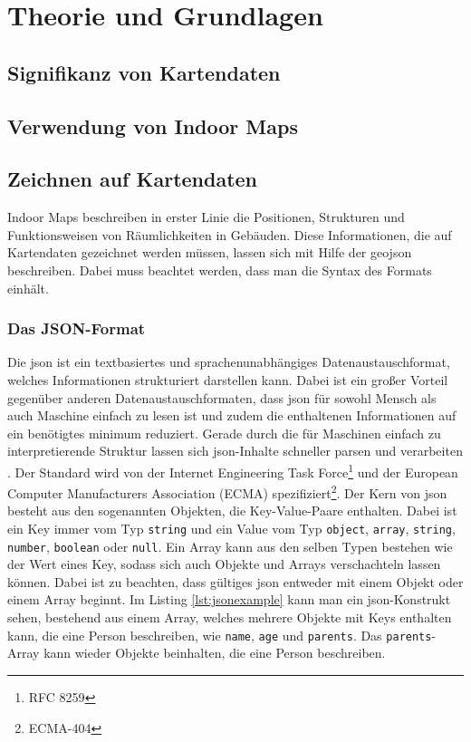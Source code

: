 \chapter{Theorie und Grundlagen}
\section{Signifikanz von Kartendaten}

\section{Verwendung von Indoor Maps}

\section{Zeichnen auf Kartendaten}
Indoor Maps beschreiben in erster Linie die Positionen, Strukturen und Funktionsweisen von Räumlichkeiten in Gebäuden. Diese Informationen, die auf Kartendaten gezeichnet werden müssen, lassen sich mit Hilfe der \acs{geojson} beschreiben. Dabei muss beachtet werden, dass man die Syntax des Formats einhält.

\subsection{Das JSON-Format}
Die \ac{json} ist ein textbasiertes und sprachenunabhängiges Datenaustauschformat, welches Informationen strukturiert darstellen kann. Dabei ist ein großer Vorteil gegenüber anderen Datenaustauschformaten, dass \ac{json} für sowohl Mensch als auch Maschine einfach zu lesen ist und zudem die enthaltenen Informationen auf ein benötigtes minimum reduziert. Gerade durch die für Maschinen einfach zu interpretierende Struktur lassen sich \ac{json}-Inhalte schneller parsen und verarbeiten \parencite{WYS2014}. Der Standard wird von der Internet Engineering Task Force\footnote{RFC 8259} und der European Computer Manufacturers Association (ECMA) spezifiziert\footnote{ECMA-404}.\pbreak%
%
Der Kern von \ac{json} besteht aus den sogenannten Objekten, die Key-Value-Paare enthalten. Dabei ist ein Key immer vom Typ \texttt{string} und ein Value vom Typ \texttt{object}, \texttt{array}, \texttt{string}, \texttt{number}, \texttt{boolean} oder \texttt{null}. Ein Array kann aus den selben Typen bestehen wie der Wert eines Key, sodass sich auch Objekte und Arrays verschachteln lassen können. Dabei ist zu beachten, dass gültiges \ac{json} entweder mit einem Objekt oder einem Array beginnt. Im Listing \ref{lst:jsonexample} kann man ein \ac{json}-Konstrukt sehen, bestehend aus einem Array, welches mehrere Objekte mit Keys enthalten kann, die eine Person beschreiben, wie \texttt{name}, \texttt{age} und \texttt{parents}. %
Das \texttt{parents}-Array kann wieder Objekte beinhalten, die eine Person beschreiben.
%
%
